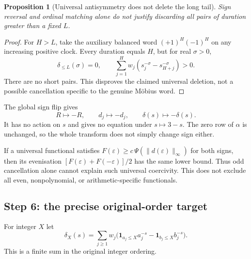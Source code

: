 \documentclass[11pt]{amsart}
\numberwithin{equation}{section}
\theoremstyle{plain}
\newtheorem{proposition}[theorem]{Proposition}
\theoremstyle{definition}
\theoremstyle{remark}
\begin{document}
\begin{proposition}[Universal antisymmetry does not delete the long tail]
\label{prop:a12-no-universal-tail}
Sign reversal and ordinal matching alone do not justify discarding all
pairs of duration greater than a fixed $L$.
\end{proposition}
\begin{proof}
For $H>L$, take the auxiliary balanced word $(+1)^H(-1)^H$ on any
increasing positive clock. Every duration equals $H$, but for real
$\sigma>0$,
\begin{equation}
\label{eq:a12-tail-counterexample}
\delta_{\le L}(\sigma)=0,\qquad
\sum_{j=1}^H w_j(s_j^{-\sigma}-s_{H+j}^{-\sigma})>0.
\end{equation}
There are no short pairs. This disproves the claimed universal deletion,
not a possible cancellation specific to the genuine M\"obius word.
\end{proof}

The global sign flip gives
\begin{equation}
\label{eq:a12-signflip}
R\mapsto-R,\qquad d_j\mapsto-d_j,\qquad \delta(s)\mapsto-\delta(s).
\end{equation}
It has no action on $s$ and gives no equation under $s\mapsto3-s$.
The zero row of $\alpha$ is unchanged, so the whole transform does not
simply change sign either.

If a universal functional satisfies
$F(\varepsilon)\ge c\,\Psi(\|d(\varepsilon)\|_\infty)$ for both signs,
then its evenisation
$[F(\varepsilon)+F(-\varepsilon)]/2$ has the same lower bound.
Thus odd cancellation alone cannot explain such universal coercivity.
This does not exclude all even, nonpolynomial, or arithmetic-specific
functionals.

\subsection{Step 6: the precise original-order target}
\label{subsec:a12-cauchy}
For integer $X$ let
\begin{equation}
\label{eq:a12-delta-X}
\delta_X(s)=\sum_{j\ge1}w_j
\bigl(\mathbf1_{a_j\le X}a_j^{-s}-\mathbf1_{b_j\le X}b_j^{-s}\bigr).
\end{equation}
This is a finite sum in the original integer ordering.
\end{document}
